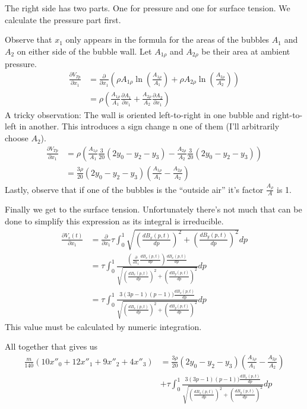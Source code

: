 \documentclass{article}
\begin{document}
The right side has two parts. One for pressure and one for surface tension. We
calculate the pressure part first. 

Observe that $x_1$ only appears in the formula for the areas of the bubbles
$A_1$ and $A_2$ on either side of the bubble wall. Let $A_{1\rho}$ and
$A_{2\rho}$ be their area at ambient pressure. 
\begin{align*}
\frac{\partial V_{Tp}}{\partial x_1} &= \frac{\partial }{\partial x_1}
\left(
\rho A_{1\rho}
\ln\left(\frac{A_{1\rho}}{A_1}\right)
+\rho A_{2\rho}
\ln\left(\frac{A_{2\rho}}{A_2}\right)
\right)\\
&= 
\rho \left(
\frac{A_{1\rho}}{A_1} \frac{\partial A_1}{\partial x_1}
+\frac{A_{2\rho}}{A_2} \frac{\partial A_2}{\partial x_1}
\right)
\end{align*}
A tricky observation: The wall is oriented left-to-right in one bubble and
right-to-left in another. This introduces a sign change n one of them (I'll
arbitrarily choose $A_2$).
\begin{align*}
\frac{\partial V_{Tp}}{\partial x_1} &= 
\rho \left(
\frac{A_{1\rho}}{A_1} \frac{3}{20}(2y_0-y_2-y_3)
-\frac{A_{2\rho}}{A_2} \frac{3}{20}(2y_0-y_2-y_3)
\right)\\
&= 
 \frac{3\rho}{20} (2y_0-y_2-y_3)
\left( \frac{A_{1\rho}}{A_1} -\frac{A_{2\rho}}{A_2}\right)
\end{align*}
Lastly, observe that if one of the bubbles is the ``outside air'' it's factor
$\frac{A_{\rho}}{A}$ is 1.

Finally we get to the surface tension. Unfortunately there's not much that can
be done to simplify this expression as its integral is irreducible.
\begin{align*}
\frac{\partial V_s(t)}{\partial x_1}&=
\frac{\partial}{\partial x_1}
\tau \int_0^1 \sqrt{\left(\frac{d B_x(p,t)}{dp}\right)^2+\left(\frac{d
B_y(p,t)}{dp}\right)^2} dp\\
&=
\tau\int_0^1\frac{\left(\frac{\partial}{\partial x_1}\frac{d
B_x(p,t)}{dp}\right) \frac{d B_x(p,t)}{dp}}{
  \sqrt{\left(\frac{d B_x(p,t)}{dp}\right)^2+\left(\frac{d
B_y(p,t)}{dp}\right)^2}} dp\\
&=
\tau\int_0^1\frac{3(3p-1)(p-1))  \frac{d B_x(p,t)}{dp}}{
  \sqrt{\left(\frac{d B_x(p,t)}{dp}\right)^2+\left(\frac{d
B_y(p,t)}{dp}\right)^2}} dp
\end{align*}
This value must be calculated by numeric integration.

All together that gives us
\begin{align*}
\frac{m}{140} \left(10x''_0+12x''_1+9x''_2+4x''_3 \right) &= 
 \frac{3\rho}{20} (2y_0-y_2-y_3)
\left( \frac{A_{1\rho}}{A_1} -\frac{A_{2\rho}}{A_2}\right)\\
&+\tau\int_0^1\frac{3(3p-1)(p-1))  \frac{d B_x(p,t)}{dp}}{
  \sqrt{\left(\frac{d B_x(p,t)}{dp}\right)^2+\left(\frac{d
B_y(p,t)}{dp}\right)^2}} dp
\end{align*}
\end{document}
